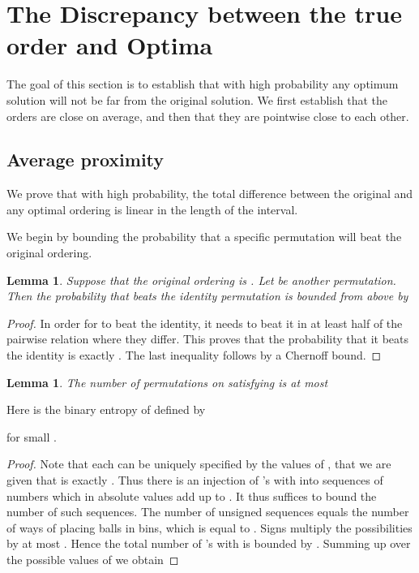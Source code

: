 \documentclass[11pt]{article}
\newtheorem{lemma}[theorem]{Lemma}
\begin{document}
\section{The Discrepancy between the true order and Optima} 
\label{sec:dist}

The goal of this section is to establish that with high probability any optimum
solution will not be far from the original solution. We first establish that 
the orders are close on average, and then that they are pointwise close to each 
other. 

\subsection{Average proximity} \label{subsec:lin_dist}

We prove that with high probability, the total difference between the original and any optimal ordering is linear in the length of the interval.

We begin by bounding the probability that a specific permutation  
will beat the original ordering. 

\begin{lemma} \label{lem:two_perms}
Suppose that the original ordering is . 
Let  be another permutation. Then the probability that 
 beats the identity permutation is bounded from above by

\end{lemma}

\begin{proof}
In order for  to beat the identity, it needs to beat it in at least 
half of the  pairwise relation where they differ. This proves 
that the probability that it beats the identity is exactly 
. The last inequality follows by a 
Chernoff bound. 
\end{proof}

\begin{lemma} \label{lem:distance_distribution}
The number of permutations  on  satisfying  
is at most

\end{lemma}

Here  is the binary entropy of  defined by 

for small . 

\begin{proof}
Note
that each  can be uniquely specified by the values of 
, that we are given that  is exactly 
. Thus there is an injection of 's with  into 
sequences of  numbers which in absolute values add up to . 
It thus suffices to bound the number of such sequences.
The number of unsigned sequences equals the number of 
ways of placing  balls in  bins, which is equal to .
Signs multiply the possibilities by at most . Hence the total number of 
's with  is bounded by . Summing 
up over the possible values of  we obtain

\end{proof}
\end{document}
